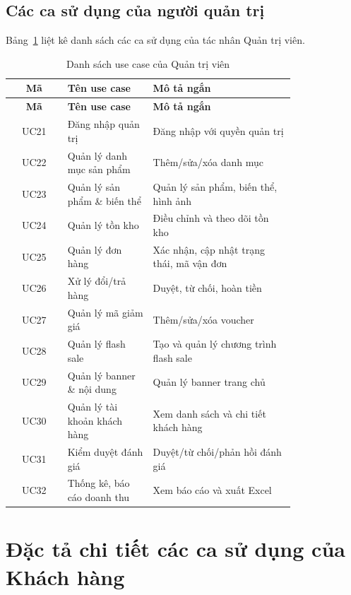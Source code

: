 \subsection{Các ca sử dụng của người quản trị}

Bảng~\ref{tab:uc-admin-list} liệt kê danh sách các ca sử dụng của tác nhân Quản trị viên.

\begin{longtable}{|c|>{\raggedright\arraybackslash}p{0.30\linewidth}|>{\raggedright\arraybackslash}p{0.50\linewidth}|}
\caption{Danh sách use case của Quản trị viên}\label{tab:uc-admin-list}\\
\hline
\rowcolor{gray!12}\textbf{Mã} & \textbf{Tên use case} & \textbf{Mô tả ngắn} \\ \hline
\endfirsthead
\hline
\rowcolor{gray!12}\textbf{Mã} & \textbf{Tên use case} & \textbf{Mô tả ngắn} \\ \hline
\endhead
UC21 & Đăng nhập quản trị & Đăng nhập với quyền quản trị \\ \hline
UC22 & Quản lý danh mục sản phẩm & Thêm/sửa/xóa danh mục \\ \hline
UC23 & Quản lý sản phẩm \& biến thể & Quản lý sản phẩm, biến thể, hình ảnh \\ \hline
UC24 & Quản lý tồn kho & Điều chỉnh và theo dõi tồn kho \\ \hline
UC25 & Quản lý đơn hàng & Xác nhận, cập nhật trạng thái, mã vận đơn \\ \hline
UC26 & Xử lý đổi/trả hàng & Duyệt, từ chối, hoàn tiền \\ \hline
UC27 & Quản lý mã giảm giá & Thêm/sửa/xóa voucher \\ \hline
UC28 & Quản lý flash sale & Tạo và quản lý chương trình flash sale \\ \hline
UC29 & Quản lý banner \& nội dung & Quản lý banner trang chủ \\ \hline
UC30 & Quản lý tài khoản khách hàng & Xem danh sách và chi tiết khách hàng \\ \hline
UC31 & Kiểm duyệt đánh giá & Duyệt/từ chối/phản hồi đánh giá \\ \hline
UC32 & Thống kê, báo cáo doanh thu & Xem báo cáo và xuất Excel \\ \hline
\end{longtable}

\section{Đặc tả chi tiết các ca sử dụng của Khách hàng}

